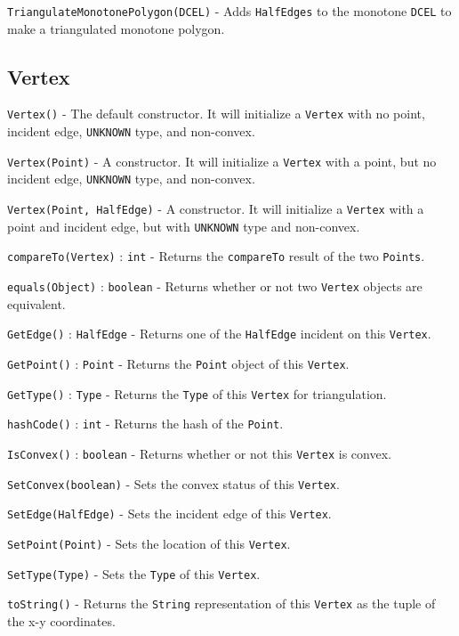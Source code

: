 \documentclass[11pt]{article}
\begin{document}
\texttt{TriangulateMonotonePolygon(DCEL)} - Adds \texttt{HalfEdges} to the monotone \texttt{DCEL} to make a triangulated monotone polygon.

\subsection{Vertex}
\label{sec:vertex}

\texttt{Vertex()} - The default constructor. It will initialize a \texttt{Vertex} with no point, incident edge, \texttt{UNKNOWN} type, and non-convex.

\texttt{Vertex(Point)} - A constructor. It will initialize a \texttt{Vertex} with a point, but no incident edge, \texttt{UNKNOWN} type, and non-convex.

\texttt{Vertex(Point, HalfEdge)} - A constructor. It will initialize a \texttt{Vertex} with a point and incident edge, but with \texttt{UNKNOWN} type and non-convex.

\texttt{compareTo(Vertex)} : \texttt{int} - Returns the \texttt{compareTo} result of the two \texttt{Points}.

\texttt{equals(Object)} : \texttt{boolean} - Returns whether or not two \texttt{Vertex} objects are equivalent.

\texttt{GetEdge()} : \texttt{HalfEdge} - Returns one of the \texttt{HalfEdge} incident on this \texttt{Vertex}.

\texttt{GetPoint()} : \texttt{Point} - Returns the \texttt{Point} object of this \texttt{Vertex}.

\texttt{GetType()} : \texttt{Type} - Returns the \texttt{Type} of this \texttt{Vertex} for triangulation.

\texttt{hashCode()} : \texttt{int} - Returns the hash of the \texttt{Point}.

\texttt{IsConvex()} : \texttt{boolean} - Returns  whether or not this \texttt{Vertex} is convex.

\texttt{SetConvex(boolean)} - Sets the convex status of this \texttt{Vertex}.

\texttt{SetEdge(HalfEdge)} - Sets the incident edge of this \texttt{Vertex}.

\texttt{SetPoint(Point)} - Sets the location of this \texttt{Vertex}.

\texttt{SetType(Type)} - Sets the \texttt{Type} of this \texttt{Vertex}.

\texttt{toString()} - Returns the \texttt{String} representation of this \texttt{Vertex} as the tuple of the x-y coordinates.
\end{document}
